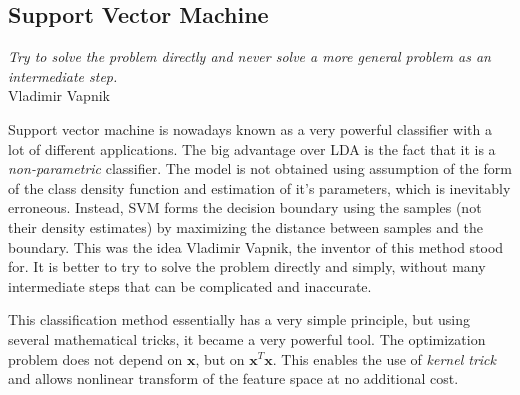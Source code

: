 \documentclass{article}
\begin{document}
\subsection{Support Vector Machine}

\begin{myquote}
\begin{flushright}
\textit{Try to solve the problem directly and never solve a more general problem as an intermediate step.} \\Vladimir Vapnik
\end{flushright}
\end{myquote}


Support vector machine is nowadays known as a very powerful classifier with a lot of different applications. The big advantage over LDA is the fact that it is a \emph{non-parametric} classifier. The model is not obtained using assumption of the form of the class density function and estimation of it's parameters, which is inevitably erroneous. Instead, SVM forms the decision boundary using the samples (not their density estimates) by maximizing the distance between samples and the boundary.
This was the idea Vladimir Vapnik, the inventor of this method stood for. It is better to try to solve the problem directly and simply, without many intermediate steps that can be complicated and inaccurate.

This classification method essentially has a very simple principle, but using several mathematical tricks, it became a very powerful tool. The optimization problem does not depend on $\mathbf{x}$, but on $\mathbf{x}^T\mathbf{x}$. This enables the use of \emph{kernel trick} and allows nonlinear transform of the feature space at no additional cost. 
\end{document}
